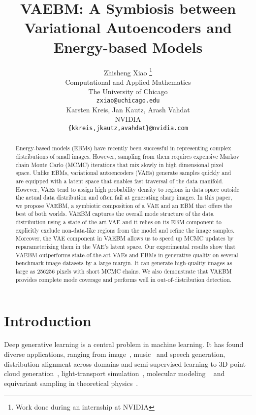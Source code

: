 \documentclass{article} \usepackage{iclr2021_conference,times}
\title{VAEBM: A Symbiosis between Variational Autoencoders and Energy-based Models}
\author{Zhisheng Xiao \thanks{Work done during an internship at NVIDIA} \\
Computational and Applied Mathematics\\
The University of Chicago\\
\texttt{zxiao@uchicago.edu} \\
\And
Karsten Kreis, Jan Kautz, Arash Vahdat \\
NVIDIA\\
\texttt{\{kkreis,jkautz,avahdat\}@nvidia.com} \\
}
\begin{document}
\maketitle

\begin{abstract}
Energy-based models (EBMs) have recently been successful in representing complex distributions of small images. However, sampling from them requires expensive Markov chain Monte Carlo (MCMC) iterations that mix slowly in high dimensional pixel space. Unlike EBMs, variational autoencoders (VAEs) generate samples quickly and are equipped with a latent space that enables fast traversal of the data manifold. However, VAEs tend to assign high probability density to regions in data space outside the actual data distribution and often fail at generating sharp images. In this paper, we propose VAEBM, a symbiotic composition of a VAE and an EBM that offers the best of both worlds. VAEBM captures the overall mode structure of the data distribution using a state-of-the-art VAE and it relies on its EBM component to explicitly exclude non-data-like regions from the model and refine the image samples. Moreover, the VAE component in VAEBM allows us to speed up MCMC updates by reparameterizing them in the VAE's latent space. Our experimental results show that VAEBM outperforms state-of-the-art VAEs and EBMs in generative quality on several benchmark image datasets by a large margin. It can generate high-quality images as large as 256256 pixels with short MCMC chains. We also demonstrate that VAEBM provides complete mode coverage and performs well in out-of-distribution detection. 
\end{abstract}


\section{Introduction}

Deep generative learning is a central problem in machine learning. It has found diverse applications, ranging from image~\citep{brock2018large,karras2019style,razavi2019generating}, music~\citep{dhariwal2020jukebox} and speech \citep{ping2019waveflow,oord2016wavenet} generation, distribution alignment across domains \citep{zhu2017unpaired,liu2017unsupervised,tzeng2017adversarial} and semi-supervised learning \citep{kingma2014semi,izmailov2019semi} to 3D point cloud generation~\citep{yang2019pointflow}, light-transport simulation~\citep{mueller2019neural}, molecular modeling ~\citep{SanchezLengeling360,noe2019boltzmann} and equivariant sampling in theoretical physics~\citep{kanwar2020equivariant}.
\end{document}
